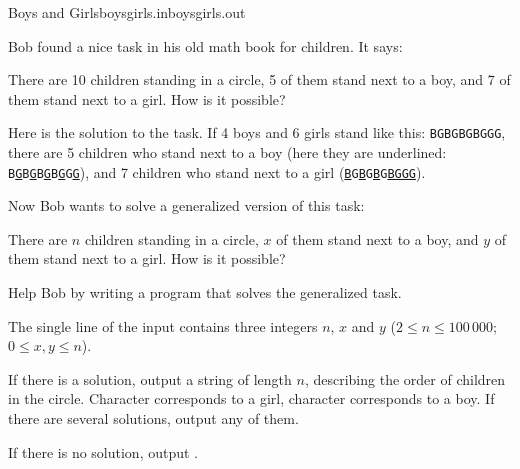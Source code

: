 \begin{problem}{Boys and Girls}{boysgirls.in}{boysgirls.out}{\timeLimit}


Bob found a nice task in his old math book for children. It says:

\begin{displayquote}
There are 10 children standing in a circle, 5 of them stand next to a boy, and 7 of them stand next to a girl. How is it possible?
\end{displayquote}

Here is the solution to the task. If 4 boys and 6 girls stand like this: \texttt{BGBGBGBGGG},
there are 5 children who stand next to a boy
(here they are underlined: \texttt{B\underline{G}B\underline{G}B\underline{G}B\underline{G}G\underline{G}}),
and 7 children who stand next to a girl (\texttt{\underline{B}G\underline{B}G\underline{B}G\underline{B}\underline{G}\underline{G}\underline{G}}).

Now Bob wants to solve a generalized version of this task:

\begin{displayquote}
There are $n$ children standing in a circle, $x$ of them stand next to a boy, and $y$ of them stand next to a girl. How is it possible?
\end{displayquote}

Help Bob by writing a program that solves the generalized task.

\InputFile

The single line of the input contains three integers $n$, $x$ and $y$
($2 \leq n \leq 100\,000$; $0\leq x, y\leq n$).

\OutputFile

If there is a solution, output a string of length $n$, describing the order of children in the circle. Character  corresponds to a girl, character  corresponds to a boy.
If there are several solutions, output any of them.

If there is no solution, output .

\Examples

\begin{example}
%
%
\end{example}

\end{problem}

